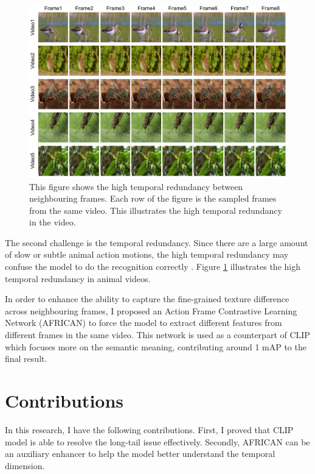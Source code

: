 \begin{figure}[h]
    \centering
    \includegraphics[width=1\textwidth]{assets/imgs/1_2_FrameComparison}
    \caption[Temporal Redundancy]{This figure shows the high temporal redundancy between neighbouring frames. Each row of the figure is the sampled frames from the same video. This illustrates the high temporal redundancy in the video.}
    \label{fig:1_2_FrameComparison}
\end{figure}

The second challenge is the temporal redundancy. Since there are a large amount of slow or subtle animal action motions, the high temporal redundancy may confuse the model to do the recognition correctly \parencite{YUAN2018221, li2022uniformer}. Figure \ref{fig:1_2_FrameComparison} illustrates the high temporal redundancy in animal videos. 

In order to enhance the ability to capture the fine-grained texture difference across neighbouring frames, I proposed an Action Frame Contrastive Learning Network (AFRICAN) to force the model to extract different features from different frames in the same video. This network is used as a counterpart of CLIP which focuses more on the semantic meaning, contributing around 1 mAP to the final result.

\section{Contributions}
In this research, I have the following contributions. First, I proved that CLIP model is able to resolve the long-tail issue effectively. Secondly, AFRICAN can be an auxiliary enhancer to help the model better understand the temporal dimension.

